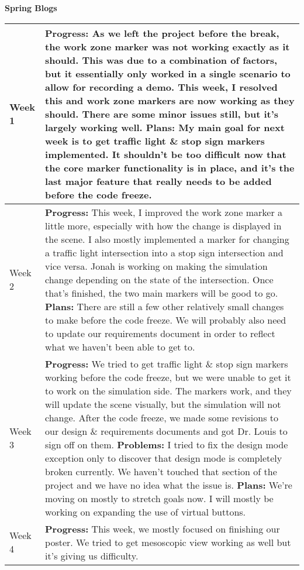 \documentclass[letterpaper, 10pt, onecolumn, draftclsnofoot]{IEEEtran}
\begin{document}
        \begin{center}
        \large{\textbf{Spring Blogs}} \\
        \begin{longtable}{|p{4cm}|p{10cm}|}
            \hline
            Week 1 & \textbf{Progress:} As we left the project before the break, the work zone marker was not working exactly as it should. This was due to a combination of factors, but it essentially only worked in a single scenario to allow for recording a demo. This week, I resolved this and work zone markers are now working as they should. There are some minor issues still, but it's largely working well. \textbf{Plans:} My main goal for next week is to get traffic light \& stop sign markers implemented. It shouldn't be too difficult now that the core marker functionality is in place, and it's the last major feature that really needs to be added before the code freeze.\\
            \hline
            Week 2 & \textbf{Progress:} This week, I improved the work zone marker a little more, especially with how the change is displayed in the scene. I also mostly implemented a marker for changing a traffic light intersection into a stop sign intersection and vice versa. Jonah is working on making the simulation change depending on the state of the intersection. Once that's finished, the two main markers will be good to go.
            \textbf{Plans:} There are still a few other relatively small changes to make before the code freeze. We will probably also need to update our requirements document in order to reflect what we haven't been able to get to.\\
            \hline
            Week 3 & \textbf{Progress:} We tried to get traffic light \& stop sign markers working before the code freeze, but we were unable to get it to work on the simulation side. The markers work, and they will update the scene visually, but the simulation will not change. After the code freeze, we made some revisions to our design \& requirements documents and got Dr. Louis to sign off on them.
            \textbf{Problems:} I tried to fix the design mode exception only to discover that design mode is completely broken currently. We haven't touched that section of the project and we have no idea what the issue is.
            \textbf{Plans:} We're moving on mostly to stretch goals now. I will mostly be working on expanding the use of virtual buttons.\\
            \hline
            Week 4 & \textbf{Progress:} This week, we mostly focused on finishing our poster. We tried to get mesoscopic view working as well but it's giving us difficulty. 

\end{longtable}
\end{center}
\end{document}
